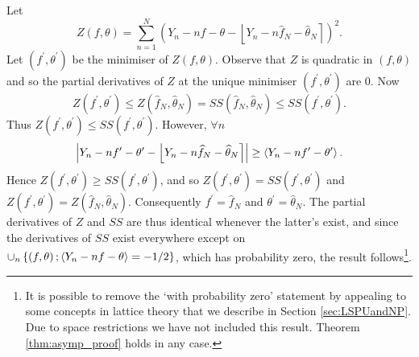 \documentclass[journal]{IEEEtran}
\begin{document}
\begin{IEEEproof}
Let
\[
Z\left(  f,\theta\right)  =\sum_{n=1}^{N}\left(  Y_{n}-nf-\theta-\left\lfloor
Y_{n}-n\widehat{f}_{N}-\widehat{\theta}_{N}\right\rceil \right)  ^{2}.
\]
Let $\left(  f^{\prime},\theta^{\prime}\right)  $ be the minimiser of
$Z\left(  f,\theta\right)$. Observe that $Z$ is quadratic in
$\left( f,\theta \right)$ and so the partial derivatives of $Z$ at the unique minimiser 
$\left(  f^{\prime},\theta^{\prime}\right)$ are $0$. Now%
\[
Z\left(  f^{\prime},\theta^{\prime}\right)  \leq Z\left(  \widehat{f}%
_{N},\widehat{\theta}_{N}\right)  =SS\left(  \widehat{f}_{N},\widehat{\theta
}_{N}\right)  \leq SS\left(  f^{\prime},\theta^{\prime}\right)  .
\]
Thus $Z\left(  f^{\prime},\theta^{\prime}\right)  \leq SS\left(  f^{\prime}%
,\theta^{\prime}\right)$. However, $\forall n$
\[
\left\vert Y_{n}-nf^{\prime}-\theta^{\prime}-{\left\lfloor  Y_{n}-n\widehat
{f}_{N}-\widehat{\theta}_{N}  \right\rceil} \right\vert \geq\left< 
Y_{n}-nf^{\prime}-\theta^{\prime}  \right>  .
\]
Hence $Z\left(  f^{\prime},\theta^{\prime}\right)  \geq SS\left(  f^{\prime},\theta^{\prime}\right)$, and so $Z\left(  f^{\prime},\theta^{\prime}\right)  =SS\left(  f^{\prime},\theta^{\prime}\right)$ and $Z\left(  f^{\prime},\theta^{\prime}\right)  =Z\left(  \widehat{f}_{N},\widehat{\theta}_{N}\right)$. Consequently $f^{\prime}=\widehat{f}_{N}$ and $\theta^{\prime}=\widehat{\theta}_{N}.$ The partial derivatives of $Z$ and $SS$ are thus identical whenever the latter's exist, and since the derivatives of $SS$ exist everywhere except on $\cup_{n}\left\{  \left(  f,\theta\right)  ; \left<   Y_{n}-nf-\theta  \right> =-1/2\right\}$, which has probability zero, the result follows\footnote{It is possible to remove the `with probability zero' statement by appealing to some concepts in lattice theory that we describe in Section \ref{sec:LSPUandNP}.  Due to space restrictions we have not included this result.  Theorem \ref{thm:asymp_proof} holds in any case.}.
\end{IEEEproof}


\end{document}
